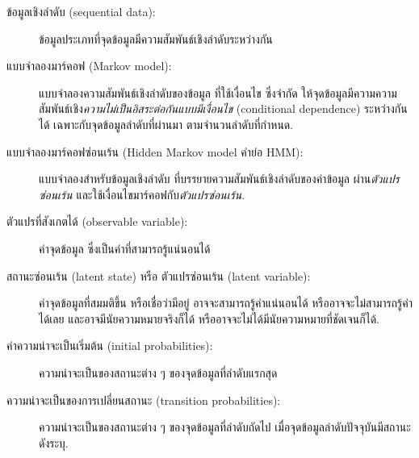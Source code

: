 \begin{description}
	
	\item[ข้อมูลเชิงลำดับ (sequential data):] 
	ข้อมูลประเภทที่จุดข้อมูลมีความสัมพันธ์เชิงลำดับระหว่างกัน
	
	
	\item[แบบจำลองมาร์คอฟ (Markov model):] 
	แบบจำลองความสัมพันธ์เชิงลำดับของข้อมูล ที่ใช้เงื่อนไข
	ซึ่งจำกัด ให้จุดข้อมูลมีความความสัมพันธ์เชิง\textit{ความไม่เป็นอิสระต่อกันแบบมีเงื่อนไข} (conditional dependence) ระหว่างกันได้ เฉพาะกับจุดข้อมูลลำดับที่ผ่านมา ตามจำนวนลำดับที่กำหนด.


	\item[แบบจำลองมาร์คอฟซ่อนเร้น (Hidden Markov model คำย่อ HMM):]
	แบบจำลองสำหรับข้อมูลเชิงลำดับ ที่บรรยายความสัมพันธ์เชิงลำดับของค่าข้อมูล ผ่าน\textit{ตัวแปรซ่อนเร้น}
	และใช้เงื่อนไขมาร์คอฟกับ\textit{ตัวแปรซ่อนเร้น}.
	
		
	\item[ตัวแปรที่สังเกตได้ (observable variable):]
	ค่าจุดข้อมูล ซึ่งเป็นค่าที่สามารถรู้แน่นอนได้
	
	\item[สถานะซ่อนเร้น (latent state) หรือ ตัวแปรซ่อนเร้น (latent variable):]
ค่าจุดข้อมูลที่สมมติขึ้น หรือเชื่อว่ามีอยู่
อาจจะสามารถรู้ค่าแน่นอนได้ หรืออาจจะไม่สามารถรู้ค่าได้เลย 
และอาจมีนัยความหมายจริงก็ได้ หรืออาจจะไม่ได้มีนัยความหมายที่ชัดเจนก็ได้.

	\item[ค่าความน่าจะเป็นเริ่มต้น (initial probabilities):]
ความน่าจะเป็นของสถานะต่าง ๆ ของจุดข้อมูลที่ลำดับแรกสุด

	\item[ความน่าจะเป็นของการเปลี่ยนสถานะ  (transition probabilities):]
ความน่าจะเป็นของสถานะต่าง ๆ ของจุดข้อมูลที่ลำดับถัดไป เมื่อจุดข้อมูลลำดับปัจจุบันมีสถานะดังระบุ.


\end{description}
